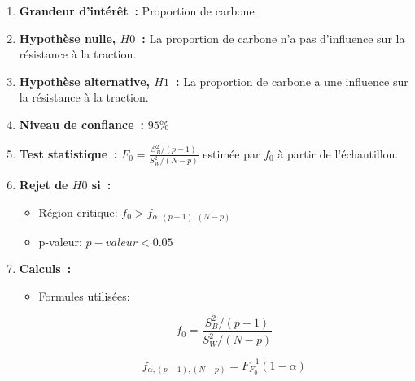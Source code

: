 \begin{enumerate}
    \item \textbf{Grandeur d'intérêt~:} Proportion de carbone.
    \vspace{.1cm}
   \item \textbf{Hypothèse nulle, $H0$~:} La proportion de carbone n'a pas d'influence sur la résistance à la traction.
    \vspace{.1cm}
   \item \textbf{Hypothèse alternative, $H1$~:} La proportion de carbone a une influence sur la résistance à la traction.
    \vspace{.1cm}
   \item \textbf{Niveau de confiance~:} $95\%$
    \vspace{.1cm}
   \item \textbf{Test statistique~:} $F_{0} = \frac{S^{2}_{B}/(p-1)}{S^{2}_{W}/(N-p)}$ estimée par $f_{0}$ à partir de l'échantillon.
    \vspace{.1cm}
   \item \textbf{Rejet de $H0$ si~:}
        \begin{itemize}
            \item Région critique: $f_{0} > f_{\alpha, (p-1), (N-p)}$
            \item p-valeur: $p-valeur < 0.05$
        \end{itemize}

    \item \textbf{Calculs~:}
    \begin{itemize}
        \item Formules utilisées:
            \begin{figure}[!h]
                \centering
                \begin{minipage}{.48\linewidth}
                    \begin{equation}
                        f_{0} = \frac{S^{2}_{B}/(p-1)}{S^{2}_{W}/(N-p)}
                    \end{equation}
                \end{minipage}\hfill\vline
                \begin{minipage}{.48\linewidth}
                    \begin{equation}
                        f_{\alpha, (p-1), (N-p)} = F^{-1}_{F_{0}}(1 - \alpha)
                    \end{equation}
                \end{minipage}
            \end{figure}


\end{itemize}
\end{enumerate}
